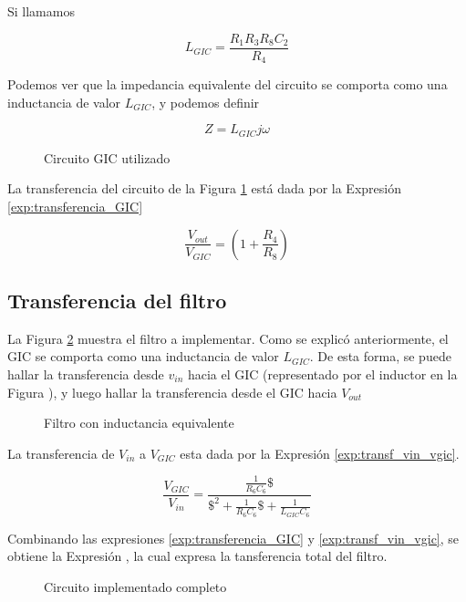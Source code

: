 Si llamamos

\[
L_{GIC} = \frac{R_1R_3R_8C_2}{R_4}
\]

Podemos ver que la impedancia equivalente del circuito se comporta como una inductancia de valor $L_{GIC}$, y podemos definir

\[
Z = L_{GIC}j\omega
\]


\begin{figure}[h]
\centering

\caption{Circuito GIC utilizado}
\label{fig:1_gic_aislado}
\end{figure}

La transferencia del circuito de la Figura \ref{fig:1_gic_aislado} está dada por la Expresión \ref{exp:transferencia_GIC}

\begin{equation}
\frac{V_{out}}{V_{GIC}} = \left(1 + \frac{R_4}{R_8}\right)
\label{exp:transferencia_GIC}
\end{equation}

\subsection{Transferencia del filtro}\label{section_transf_filtro}
La Figura \ref{circuito_induct} muestra el filtro a implementar. Como se explicó anteriormente, el GIC se comporta como una inductancia de valor $L_{GIC}$. De esta forma, se puede hallar la transferencia desde $v_{in}$ hacia el GIC (representado por el inductor en la Figura ), y luego hallar la transferencia desde el GIC hacia $V_{out}$

\begin{figure}[h]
\centering

\caption{Filtro con inductancia equivalente}
\label{circuito_induct}
\end{figure}

La transferencia de $V_{in}$ a $V_{GIC}$ esta dada por la Expresión \ref{exp:transf_vin_vgic}.

\begin{equation}
\frac{V_{GIC}}{V_{in}} = \frac{\frac{1}{R_6C_6}\$}{\$^2 + \frac{1}{R_6C_6}\$ + \frac{1}{L_{GIC}C_6}}
\label{exp:transf_vin_vgic}
\end{equation}

Combinando las expresiones \ref{exp:transferencia_GIC} y \ref{exp:transf_vin_vgic}, se obtiene la Expresión  , la cual expresa la tansferencia total del filtro.

\begin{figure}[h]
\centering

\caption{Circuito implementado completo}
\label{fig:6_circuito_completo}
\end{figure}

